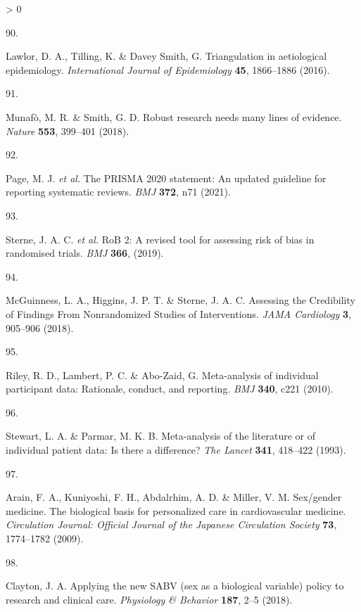 \documentclass[a4paper, twoside]{templates/ociamthesis}
\newlength{\cslhangindent}
\newlength{\csllabelwidth}
\newenvironment{CSLReferences}[3] %
 {%
  \setlength{\parindent}{0pt}
  \ifodd #1 \everypar{\setlength{\hangindent}{\cslhangindent}}\ignorespaces\fi
  \ifnum #2 > 0
  \setlength{\parskip}{#2\baselineskip}
  \fi
 }%
 {}
\newcommand{\CSLLeftMargin}[1]{\parbox[t]{\maxof{\widthof{#1}}{\csllabelwidth}}{#1}}
\newcommand{\CSLRightInline}[1]{\parbox[t]{\linewidth - \csllabelwidth}{#1}}
\begin{document}
\begin{CSLReferences}{0}{0}
\leavevmode\hypertarget{ref-lawlor2016}{}%
\CSLLeftMargin{90. }
\CSLRightInline{Lawlor, D. A., Tilling, K. \& Davey Smith, G. Triangulation in aetiological epidemiology. \emph{International Journal of Epidemiology} \textbf{45}, 1866--1886 (2016).}

\leavevmode\hypertarget{ref-munafo2018}{}%
\CSLLeftMargin{91. }
\CSLRightInline{Munafò, M. R. \& Smith, G. D. Robust research needs many lines of evidence. \emph{Nature} \textbf{553}, 399--401 (2018).}

\leavevmode\hypertarget{ref-page2021}{}%
\CSLLeftMargin{92. }
\CSLRightInline{Page, M. J. \emph{et al.} The {PRISMA} 2020 statement: An updated guideline for reporting systematic reviews. \emph{BMJ} \textbf{372}, n71 (2021).}

\leavevmode\hypertarget{ref-sterne2019}{}%
\CSLLeftMargin{93. }
\CSLRightInline{Sterne, J. A. C. \emph{et al.} {RoB} 2: A revised tool for assessing risk of bias in randomised trials. \emph{BMJ} \textbf{366}, (2019).}

\leavevmode\hypertarget{ref-mcguinness2018}{}%
\CSLLeftMargin{94. }
\CSLRightInline{McGuinness, L. A., Higgins, J. P. T. \& Sterne, J. A. C. Assessing the {Credibility} of {Findings From Nonrandomized Studies} of {Interventions}. \emph{JAMA Cardiology} \textbf{3}, 905--906 (2018).}

\leavevmode\hypertarget{ref-riley2010}{}%
\CSLLeftMargin{95. }
\CSLRightInline{Riley, R. D., Lambert, P. C. \& Abo-Zaid, G. Meta-analysis of individual participant data: Rationale, conduct, and reporting. \emph{BMJ} \textbf{340}, c221 (2010).}

\leavevmode\hypertarget{ref-stewart1993}{}%
\CSLLeftMargin{96. }
\CSLRightInline{Stewart, L. A. \& Parmar, M. K. B. Meta-analysis of the literature or of individual patient data: Is there a difference? \emph{The Lancet} \textbf{341}, 418--422 (1993).}

\leavevmode\hypertarget{ref-arain2009}{}%
\CSLLeftMargin{97. }
\CSLRightInline{Arain, F. A., Kuniyoshi, F. H., Abdalrhim, A. D. \& Miller, V. M. Sex/gender medicine. {The} biological basis for personalized care in cardiovascular medicine. \emph{Circulation Journal: Official Journal of the Japanese Circulation Society} \textbf{73}, 1774--1782 (2009).}

\leavevmode\hypertarget{ref-clayton2018}{}%
\CSLLeftMargin{98. }
\CSLRightInline{Clayton, J. A. Applying the new {SABV} (sex as a biological variable) policy to research and clinical care. \emph{Physiology \& Behavior} \textbf{187}, 2--5 (2018).}


\end{CSLReferences}
\end{document}
